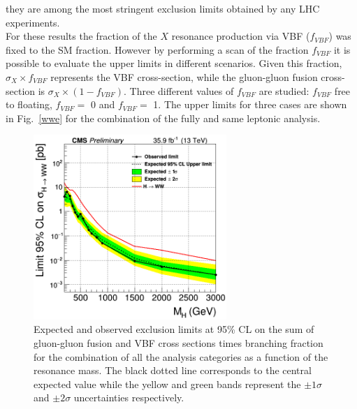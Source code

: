 they are among the most stringent exclusion limits obtained by any LHC experiments.\\
\newline
For these results the fraction of the $X$ resonance production via VBF  ($f_{VBF}$)  was fixed to the SM fraction. 
However by performing a scan of the fraction $f_{VBF}$ it is possible to evaluate the upper limits in different scenarios. 
Given this fraction, $\sigma_X \times f_{VBF}$ represents the VBF  cross-section, while
the gluon-gluon fusion cross-section is $\sigma_X \times ( 1-  f_{VBF} )$. 
Three different values of  $f_{VBF}$ are studied:   $f_{VBF}$ free to floating, $f_{VBF}=$ 0 and $f_{VBF}=$ 1. 
The upper limits for three cases are shown in Fig.~\ref{wwe}  for the combination of the fully and same leptonic analysis.
\begin{figure}[H]
\centering
\includegraphics[width=0.65\textwidth]{../Cap6/all}
\caption{Expected and observed exclusion limits at 95\% CL on the sum of gluon-gluon fusion and VBF cross
sections times branching fraction for the combination of all the analysis categories as a function
of the resonance mass. The black dotted line corresponds to the central expected value while
the yellow and green bands represent the $\pm 1 \sigma$ and $\pm 2 \sigma$ uncertainties respectively.}
\label{lim_superC}
\end{figure}
